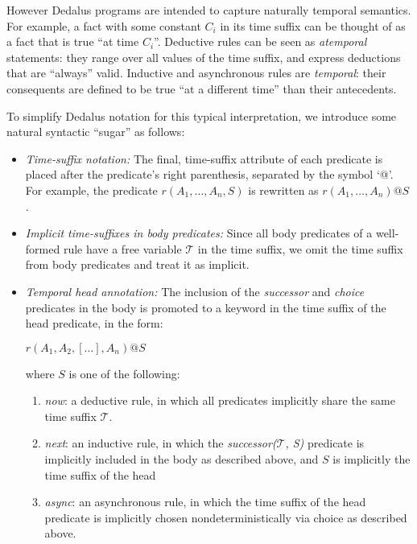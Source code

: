 \documentclass{acm_proc_article-sp-sigmod09}
\newcommand{\Tau}{\mathcal{T}}
\newcommand{\jmh}[1]{{\textcolor{red}{#1 -- jmh}}}
\begin{document}
However Dedalus programs are intended to capture naturally temporal semantics.  For example, a fact with some constant $C_i$ in its time suffix can be thought of as a fact that is true ``at time $C_i$''.  Deductive rules can be seen as {\em atemporal} statements: they range over all values of the time suffix, and express deductions that are ``always'' valid.
Inductive and asynchronous rules are {\em temporal}:
their consequents are defined to be true ``at a different time'' than their antecedents. 

To simplify Dedalus notation for this typical interpretation,  we introduce some natural syntactic ``sugar'' as follows:  

\begin{itemize}
	\item {\em Time-suffix notation:}  The final, time-suffix attribute of each predicate is placed after the predicate's right parenthesis, separated by the symbol `@'.   For example, the predicate $r(A_{1}, \ldots, A_{n}, S)$ is rewritten as $r(A_{1}, \ldots, A_{n})@S$.
	\item {\em Implicit time-suffixes in body predicates:} Since all body predicates of a well-formed rule have a free variable $\Tau$ in the time suffix, we omit the time suffix from body predicates and treat it as implicit. 
	\item {\em Temporal head annotation:} The inclusion of the \emph{successor}
and \emph{choice} predicates in the body is promoted to a keyword in the time suffix of the head predicate, in the form:

$r(A_{1},A_{2},[...],A_{n})@S$

where $S$ is one of the following:
\begin{enumerate}
\item \emph{now}: a deductive rule, in which all predicates implicitly share the same time suffix $\Tau$.
\item \emph{next}: an inductive rule, in which the \emph{successor($\Tau$, S)} predicate is implicitly included in the body as described above, and $S$ is implicitly the time suffix of the head
\item \emph{async}: an asynchronous rule, in which the time suffix of the head predicate is implicitly chosen nondeterministically via choice as described above.
\end{enumerate}
\end{itemize}

% 
% 
\end{document}
